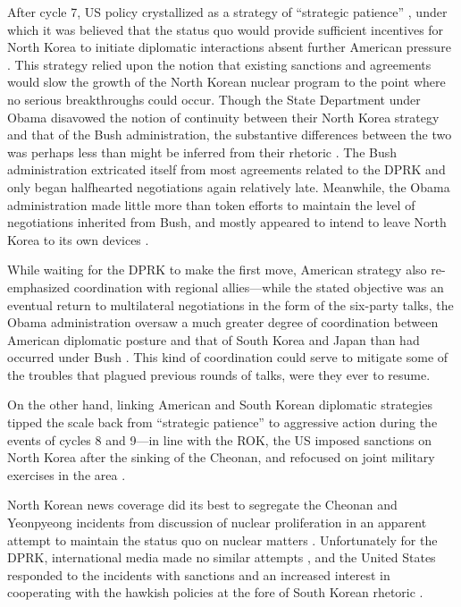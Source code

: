 After cycle 7, US policy crystallized as a strategy of ``strategic patience'' \cite{crs13}, under which it was believed that the status quo would provide sufficient incentives for North Korea to initiate diplomatic interactions absent further American pressure \cite{snyder2}. This strategy relied upon the notion that existing sanctions and agreements would slow the growth of the North Korean nuclear program to the point where no serious breakthroughs could occur. Though the State Department under Obama disavowed the notion of continuity between their North Korea strategy and that of the Bush administration, the substantive differences between the two was perhaps less than might be inferred from their rhetoric \cite{delury}. The Bush administration extricated itself from most agreements related to the DPRK and only began halfhearted negotiations again relatively late. Meanwhile, the Obama administration made little more than token efforts to maintain the level of negotiations inherited from Bush, and mostly appeared to intend to leave North Korea to its own devices \cite{delury}.

While waiting for the DPRK to make the first move, American strategy also re-emphasized coordination with regional allies---while the stated objective was an eventual return to multilateral negotiations in the form of the six-party talks, the Obama administration oversaw a much greater degree of coordination between American diplomatic posture and that of South Korea and Japan than had occurred under Bush \cite{crs13,snyder2}. This kind of coordination could serve to mitigate some of the troubles that plagued previous rounds of talks, were they ever to resume.

On the other hand, linking American and South Korean diplomatic strategies tipped the scale back from ``strategic patience'' to aggressive action during the events of cycles 8 and 9---in line with the ROK, the US imposed sanctions on North Korea after the sinking of the Cheonan, and refocused on joint military exercises in the area \cite{starr}.

North Korean news coverage did its best to segregate the Cheonan and Yeonpyeong incidents from discussion of nuclear proliferation in an apparent attempt to maintain the status quo on nuclear matters \cite{rich12}. Unfortunately for the DPRK, international media made no similar attempts \cite{beal}, and the United States responded to the incidents with sanctions and an increased interest in cooperating with the hawkish policies at the fore of South Korean rhetoric \cite{crs13}.


